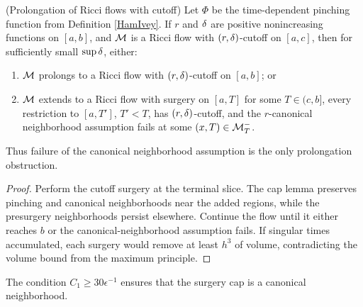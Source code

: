 \begin{lemma}
  \label{lem:kl-performing-surgery-continuing-flows-existence-canonical-neighborhoods}
(Prolongation of Ricci flows with cutoff)
\label{extendit}
Let $\Phi$ be the time-dependent pinching function from Definition
\ref{HamIvey}. If $r$ and $\delta$ are positive nonincreasing functions on
$[a,b]$, and ${\mathcal M}$ is a Ricci flow with $(r,\delta)$-cutoff on $[a,c]$, then for
sufficiently small $\sup\delta$, either:
\begin{enumerate}
\item ${\mathcal M}$ prolongs to a Ricci flow with $(r,\delta)$-cutoff on $[a,b]$; or
\item ${\mathcal M}$ extends to a Ricci flow with surgery on $[a,T]$ for some
$T\in(c,b]$, every restriction to $[a,T']$, $T'<T$, has $(r,\delta)$-cutoff,
and the $r$-canonical neighborhood assumption fails at some
$(x,T)\in{\mathcal M}_T^-$.
\end{enumerate}
Thus failure of the canonical neighborhood assumption is the only
prolongation obstruction.
\end{lemma}
\begin{proof}
\sketch Perform the cutoff surgery at the terminal slice. The cap lemma
preserves pinching and canonical neighborhoods near the added regions, while
the presurgery neighborhoods persist elsewhere. Continue the flow until it
either reaches $b$ or the canonical-neighborhood assumption fails. If
singular times accumulated, each surgery would remove at least $h^3$ of
volume, contradicting the volume bound from the maximum principle.
\end{proof}

\begin{remark}
  \label{rem:kl-performing-surgery-continuing-flows-structural-remark-canonical-neighborhoods}
 \label{30}
The condition $C_1\geq30\epsilon^{-1}$ ensures that the surgery cap is a
canonical neighborhood.
\end{remark}

